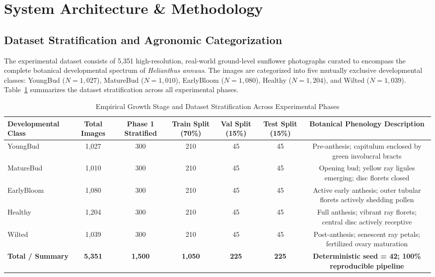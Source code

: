 \documentclass{ieeeaccess}
\begin{document}
\section{System Architecture \& Methodology}
\label{sec:methodology}

\subsection{Dataset Stratification and Agronomic Categorization}
The experimental dataset consists of 5,351 high-resolution, real-world ground-level sunflower photographs curated to encompass the complete botanical developmental spectrum of \textit{Helianthus annuus}. The images are categorized into five mutually exclusive developmental classes: YoungBud ($N = 1,027$), MatureBud ($N = 1,010$), EarlyBloom ($N = 1,080$), Healthy ($N = 1,204$), and Wilted ($N = 1,039$). Table~\ref{tab:dataset_stratification} summarizes the dataset stratification across all experimental phases.

\begin{table}[!t]
\caption{Empirical Growth Stage and Dataset Stratification Across Experimental Phases}
\label{tab:dataset_stratification}
\centering
\begin{tabular*}{\textwidth}{@{\extracolsep{\fill}}lcccccc@{}}
\toprule
\textbf{Developmental Class} & \textbf{Total Images} & \textbf{Phase 1 Stratified} & \textbf{Train Split (70\%)} & \textbf{Val Split (15\%)} & \textbf{Test Split (15\%)} & \textbf{Botanical Phenology Description} \\
\midrule
YoungBud   & 1,027 & 300 & 210 & 45 & 45 & Pre-anthesis; capitulum enclosed by green involucral bracts \\
MatureBud  & 1,010 & 300 & 210 & 45 & 45 & Opening bud; yellow ray ligules emerging; disc florets closed \\
EarlyBloom & 1,080 & 300 & 210 & 45 & 45 & Active early anthesis; outer tubular florets actively shedding pollen \\
Healthy    & 1,204 & 300 & 210 & 45 & 45 & Full anthesis; vibrant ray florets; central disc actively receptive \\
Wilted     & 1,039 & 300 & 210 & 45 & 45 & Post-anthesis; senescent ray petals; fertilized ovary maturation \\
\midrule
\textbf{Total / Summary} & \textbf{5,351} & \textbf{1,500} & \textbf{1,050} & \textbf{225} & \textbf{225} & \textbf{Deterministic seed = 42; 100\% reproducible pipeline} \\
\bottomrule
\end{tabular*}
\end{table}
\end{document}
